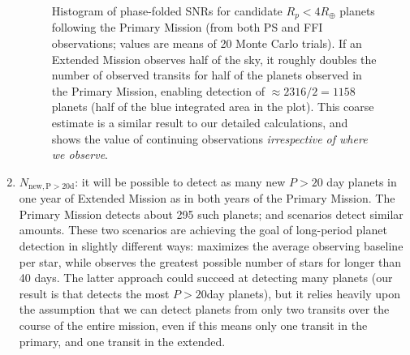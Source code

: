 \begin{enumerate}
\begin{figure}[!t]
	\caption{Histogram of phase-folded SNRs for candidate $R_p<4R_\oplus$ planets following the Primary Mission (from both PS and FFI observations; values are means of 20 Monte Carlo trials).
	If an Extended Mission observes half of the sky, it roughly doubles the number of observed transits for half of the planets observed in the Primary Mission, enabling detection of $\approx 2316/2 = 1158$ planets (half of the blue integrated area in the plot). This coarse estimate is a similar result to our detailed calculations, and shows the value of continuing \tesss observations \textit{irrespective of where we observe}.}
	\label{fig:snrf_histogram}
\end{figure}

	\item $N_\mathrm{new,P>20d}$: it will be possible to detect as many new $P>20$ day planets in one year of \tesss Extended Mission as in both years of the Primary Mission.
	The Primary Mission detects about 295 such planets; \hemis\:and \npole\:scenarios detect similar amounts.
	These two scenarios are achieving the goal of long-period planet detection in slightly different ways: %
	\npole\:maximizes the average observing baseline per star, while \hemis\:observes the greatest possible number of stars for longer than 40 days.
	The latter approach could succeed at detecting many planets (our result is that \hemis\:detects the most $P>20$day planets), but it relies heavily upon the assumption that we can detect planets from only two transits over the course of the entire mission, even if this means only one transit in the primary, and one transit in the extended.


\end{enumerate}
